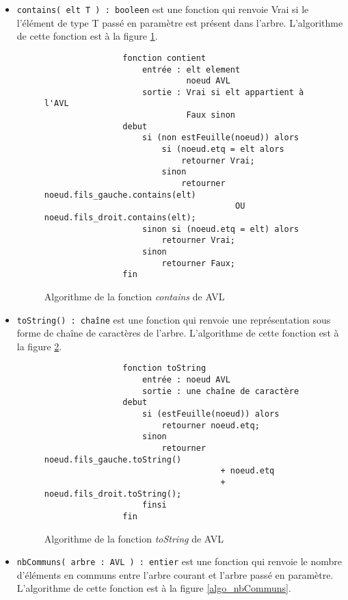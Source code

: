 \documentclass[a4paper]{article}
\begin{document}
		\begin{itemize}
			\item \verb|contains( elt T ) : booleen| est une fonction qui renvoie Vrai si le 
			l'élément de type T passé en paramètre est présent dans l'arbre. L'algorithme de
			cette fonction est à la figure \ref{algo_contains}.
			\begin{figure}
	    	    \begin{verbatim}
	    	    fonction contient
	    	        entrée : elt element
	    	                 noeud AVL
	    	        sortie : Vrai si elt appartient à l'AVL
	    	                 Faux sinon
	    	    debut
	    	        si (non estFeuille(noeud)) alors
	    	            si (noeud.etq = elt alors
	    	                retourner Vrai;
	    	            sinon
	    	                retourner noeud.fils_gauche.contains(elt) 
	    	                           OU noeud.fils_droit.contains(elt);
	    	        sinon si (noeud.etq = elt) alors
	    	            retourner Vrai;
	    	        sinon
	    	            retourner Faux;
	    	    fin
	    	    \end{verbatim}
	    	    \caption{Algorithme de la fonction \textit{contains} de AVL \label{algo_contains} }
	    	\end{figure}
			\item \verb|toString() : chaîne| est une fonction qui renvoie une représentation 
			sous forme de chaîne de caractères de l'arbre. L'algorithme de cette fonction est 
			à la figure \ref{algo_toString_avl}.
			
			\begin{figure}
	    	    \begin{verbatim}
	    	    fonction toString
	    	        entrée : noeud AVL
	    	        sortie : une chaîne de caractère
	    	    debut
	    	        si (estFeuille(noeud)) alors
	    	            retourner noeud.etq;
	    	        sinon
	    	            retourner noeud.fils_gauche.toString() 
	    	                        + noeud.etq 
	    	                        + noeud.fils_droit.toString();
	    	        finsi
	    	    fin
	    	    \end{verbatim}
	    	    \caption{Algorithme de la fonction \textit{toString} de AVL \label{algo_toString_avl} }
	    	\end{figure}
	    	
			\item \verb|nbCommuns( arbre : AVL ) : entier| est une fonction qui renvoie
			le nombre d'éléments en communs entre l'arbre courant et l'arbre passé en 
			paramètre. L'algorithme de cette fonction est à la figure \ref{algo_nbCommuns}.
			

\end{itemize}
\end{document}
